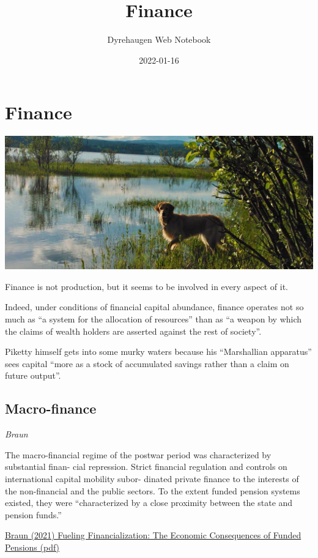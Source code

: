 \documentclass[
]{book}
\title{Finance}
\author{Dyrehaugen Web Notebook}
\date{2022-01-16}
\begin{document}
\maketitle

{
\setcounter{tocdepth}{1}
\tableofcontents
}
\hypertarget{finance}{%
\chapter{Finance}\label{finance}}

\includegraphics{fig/zelda.jpg}

Finance is not production, but it seems to be involved in every aspect of it.

Indeed, under conditions of financial capital abundance,
finance operates not so much as ``a system for the allocation of resources''
than as ``a weapon by which the claims of wealth holders are
asserted against the rest of society''.

Piketty himself gets into some murky waters because his
``Marshallian apparatus'' sees capital ``more as a stock of accumulated savings rather
than a claim on future output''.

\hypertarget{macro-finance}{%
\section{Macro-finance}\label{macro-finance}}

\emph{Braun}

The macro-financial regime of the postwar
period was characterized by substantial finan-
cial repression. Strict financial regulation and
controls on international capital mobility subor-
dinated private finance to the interests of the
non-financial and the public sectors. To the
extent funded pension systems existed, they
were ``characterized by a close proximity
between the state and pension funds.''

\href{pdf/Braun_2021_Fueling_Financialization_Funded_Pensions.pdf}{Braun (2021) Fueling Financialization: The Economic Consequences of Funded Pensions (pdf)}
\end{document}

